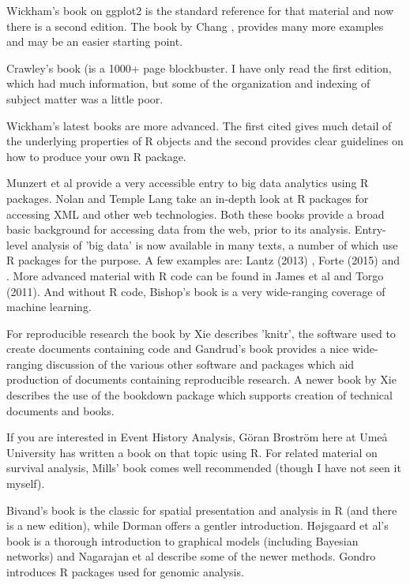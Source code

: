 \documentclass[titlepage]{book}\usepackage{knitr}
\begin{document}
Wickham's book \cite{Wickham2009} on ggplot2 is the standard reference for that material and now there is a second edition. The book by Chang \cite{Chang2012}, provides many more examples and may be an easier starting point.

Crawley's book (\cite{Crawley2012}is a 1000+ page blockbuster.  I have only read the first edition, which had much information, but some of the organization and indexing of subject matter was a little poor.

Wickham's latest books \cite{Wickham2015a, Wickham2015b} are more advanced.  The first cited gives much detail of the underlying properties of R objects and the second provides clear guidelines on how to produce your own R package. 

Munzert et al \cite{Munzert2015} provide a very accessible entry to big data analytics using R packages. Nolan and Temple Lang \cite{Nolan2014} take an in-depth look at R packages for accessing XML and other web technologies. Both these books provide a broad basic background for accessing data from the web, prior to its analysis. Entry-level analysis of 'big data' is now available in many texts, a number of which use R packages for the purpose. A few examples are: Lantz (2013) \cite{Lantz2013}, Forte (2015)\cite{Forte2015} and \cite{Silge2017}. More advanced material with R code can be found in James et al \cite{James2013} and Torgo (2011)\cite{Torgo2011}. And without R code, Bishop's book \cite{Bishop2006} is a very wide-ranging coverage of machine learning.

For reproducible research the book by Xie \cite{Xie2013} describes 'knitr', the software used to create documents containing code and Gandrud's book\cite{Gandrud2013} provides a nice wide-ranging discussion of the various other software and packages which aid production of documents containing reproducible research. A newer book by Xie  \cite{Xie2017} describes the use of the bookdown package which supports creation of technical documents and books.

If you are interested in Event History Analysis, Göran Broström\cite{Brostrom2012} here at Umeå University has written a book on that topic using R.  For related material on survival analysis, Mills' book \cite{Mills2011} comes well recommended (though I have not seen it myself).

Bivand's book\cite{Bivand2008} is the classic for spatial presentation and analysis in R (and there is a new edition), while Dorman\cite{Dorman2014} offers a gentler introduction.
H{\o}jsgaard et al's book\cite{Hojsgaard2012} is a thorough introduction to graphical models (including Bayesian networks) and Nagarajan et al\cite{Nagarajan2013} describe some of the newer methods. Gondro \cite{Gondro2015} introduces R packages used for genomic analysis.
\end{document}
